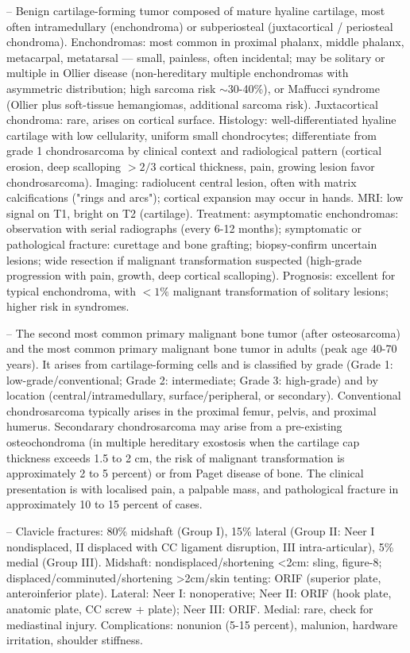 -- Benign cartilage-forming tumor composed of mature hyaline cartilage, most often intramedullary (enchondroma) or subperiosteal (juxtacortical / periosteal chondroma). Enchondromas: most common in proximal phalanx, middle phalanx, metacarpal, metatarsal — small, painless, often incidental; may be solitary or multiple in Ollier disease (non-hereditary multiple enchondromas with asymmetric distribution; high sarcoma risk $\sim 30$-40\%), or Maffucci syndrome (Ollier plus soft-tissue hemangiomas, additional sarcoma risk). Juxtacortical chondroma: rare, arises on cortical surface. Histology: well-differentiated hyaline cartilage with low cellularity, uniform small chondrocytes; differentiate from grade 1 chondrosarcoma by clinical context and radiological pattern (cortical erosion, deep scalloping $> 2/3$ cortical thickness, pain, growing lesion favor chondrosarcoma). Imaging: radiolucent central lesion, often with matrix calcifications ("rings and arcs"); cortical expansion may occur in hands. MRI: low signal on T1, bright on T2 (cartilage). Treatment: asymptomatic enchondromas: observation with serial radiographs (every 6-12 months); symptomatic or pathological fracture: curettage and bone grafting; biopsy-confirm uncertain lesions; wide resection if malignant transformation suspected (high-grade progression with pain, growth, deep cortical scalloping). Prognosis: excellent for typical enchondroma, with $< 1\%$ malignant transformation of solitary lesions; higher risk in syndromes.

-- The second most common primary malignant bone tumor (after osteosarcoma) and the most common primary malignant bone tumor in adults (peak age 40-70 years). It arises from cartilage-forming cells and is classified by grade (Grade 1: low-grade/conventional; Grade 2: intermediate; Grade 3: high-grade) and by location (central/intramedullary, surface/peripheral, or secondary). Conventional chondrosarcoma typically arises in the proximal femur, pelvis, and proximal humerus. Secondarary chondrosarcoma may arise from a pre-existing osteochondroma (in multiple hereditary exostosis when the cartilage cap thickness exceeds 1.5 to 2 cm, the risk of malignant transformation is approximately 2 to 5 percent) or from Paget disease of bone. The clinical presentation is with localised pain, a palpable mass, and pathological fracture in approximately 10 to 15 percent of cases.

-- Clavicle fractures: 80\% midshaft (Group I), 15\% lateral (Group II: Neer I nondisplaced, II displaced with CC ligament disruption, III intra-articular), 5\% medial (Group III). Midshaft: nondisplaced/shortening <2cm: sling, figure-8; displaced/comminuted/shortening >2cm/skin tenting: ORIF (superior plate, anteroinferior plate). Lateral: Neer I: nonoperative; Neer II: ORIF (hook plate, anatomic plate, CC screw + plate); Neer III: ORIF. Medial: rare, check for mediastinal injury. Complications: nonunion (5-15 percent), malunion, hardware irritation, shoulder stiffness.

